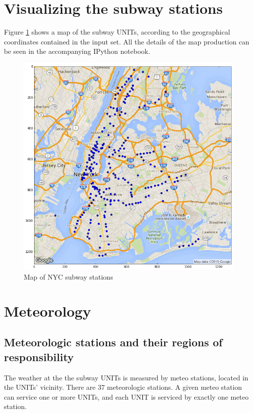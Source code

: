 \documentclass{article}
\begin{document}
\section{Visualizing the subway stations}

Figure \ref{fig:subway_stations} shows a map of the subway UNITs, according to the geographical coordinates contained in the input set. All the details of the map production can be seen in the accompanying IPython notebook.

\begin{figure}[ht]
\centering
\includegraphics[width=\textwidth]{map_stations.png}
\caption{Map of NYC subway stations}
\label{fig:subway_stations}
\end{figure}

\section{Meteorology}

\subsection{Meteorologic stations and their regions of responsibility}

The weather at the the subway UNITs is measured by meteo stations, located in the UNITs' vicinity. There are 37 meteorologic stations. A given meteo station can service one or more UNITs, and each UNIT is serviced by exactly one meteo station.
\end{document}
